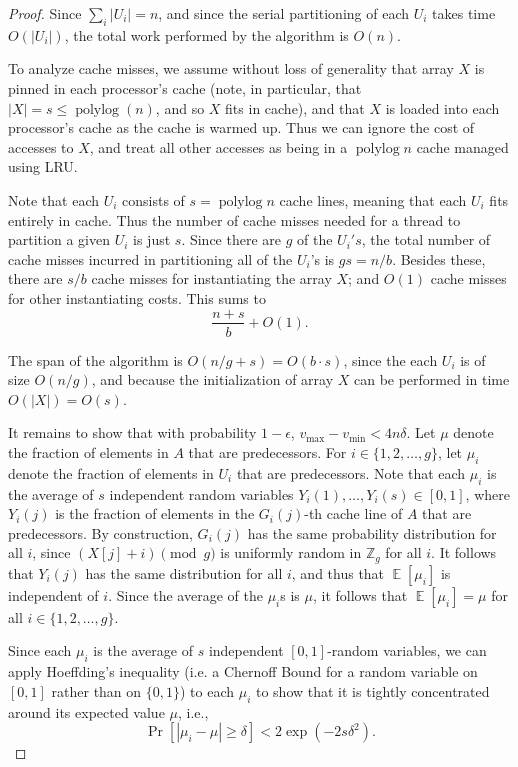 \documentclass[11pt]{article}
\def\E{\operatorname{\mathbb{E}}}
\newcommand{\polylog}{\operatorname{polylog}}
\theoremstyle{remark}
\theoremstyle{remark}
\begin{document}
\begin{proof}
Since $\sum_i |U_i| = n$, and since the serial partitioning of each $U_i$
takes time $O(|U_i|)$, the total work performed by the algorithm is
$O(n)$.

To analyze cache misses, we assume without loss of generality that
array $X$ is pinned in each processor's cache (note, in particular,
that $|X| = s \le \polylog(n)$, and so $X$ fits in cache), and that
$X$ is loaded into each processor's cache as the cache is warmed
up. Thus we can ignore the cost of accesses to $X$, and treat all
other accesses as being in a $\polylog n$ cache managed using
LRU.

Note that each $U_i$ consists of $s = \polylog n$ cache lines,
meaning that each $U_i$ fits entirely in cache. Thus the number of
cache misses needed for a thread to partition a given $U_i$ is just
$s$. Since there are $g$ of the $U_i's$, the total number of cache
misses incurred in partitioning all of the $U_i$'s is $g s =
n/b$. Besides these, there are $s/b$ cache misses for instantiating
the array $X$; and $O(1)$ cache misses for other instantiating
costs. This sums to $$\frac{n+s}{b}+O(1).$$

The span of the algorithm is $O(n/g + s) = O(b\cdot s)$, since the
each $U_i$ is of size $O(n / g)$, and because the initialization of
array $X$ can be performed in time $O(|X|) = O(s)$.

It remains to show that with probability $1-\epsilon$, $v_{\text{max}}
- v_{\text{min}} < 4n\delta$. Let $\mu$ denote the fraction of
elements in $A$ that are predecessors. For $i \in \{1, 2, \ldots,
g\}$, let $\mu_i$ denote the fraction of elements in $U_i$ that are
predecessors. Note that each $\mu_i$ is the average of $s$ independent
random variables $Y_i(1), \ldots, Y_i(s) \in [0, 1]$, where $Y_i(j)$
is the fraction of elements in the $G_i(j)$-th cache line of $A$ that
are predecessors. By construction, $G_i(j)$ has the same probability
distribution for all $i$, since $(X[j] + i) \pmod g$ is uniformly
random in $\mathbb{Z}_g$ for all $i$. It follows that $Y_i(j)$ has the
same distribution for all $i$, and thus that $\E[\mu_i]$ is
independent of $i$. Since the average of the $\mu_i$s is $\mu$, it
follows that $\E[\mu_i] = \mu$ for all $i \in \{1, 2, \ldots, g\}$.

Since each $\mu_i$ is the average of $s$ independent $[0, 1]$-random
variables, we can apply Hoeffding's inequality (i.e. a Chernoff Bound
for a random variable on $[0,1]$ rather than on $\{0,1\}$) to each
$\mu_i$ to show that it is tightly concentrated around its expected
value $\mu$, i.e.,
$$\Pr[|\mu_i - \mu| \geq \delta] < 2\exp(-2s\delta^2). $$


\end{proof}
\end{document}
